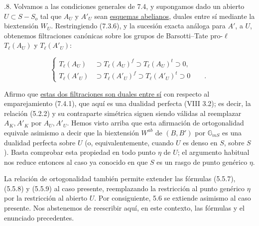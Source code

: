 \medskip
{}.8. Volvamos a las condiciones generales de 7.4, y supongamos dado
un abierto $U\subset S-S_o$ tal que $A_U$ y $A'_U$ sean
\underline{esquemas abelianos}, duales entre sí mediante la biextensión
$W_U$. Restringiendo (7.3.6), y la sucesión exacta análoga para $A'$, a
$U$, obtenemos filtraciones canónicas sobre los grupos de Barsotti--Tate
pro-$\ell$ $T_\ell(A_U)$ y $T_\ell(A'_U)$:

\begin{equation}\tag{7.4.9}
\left\{
\begin{aligned}
T_\ell(A_U)&\supset T_\ell(A_U)^f\supset T_\ell(A_U)^t\supset0,\\[4ex]
T_\ell(A'_U)&\supset T_\ell(A'_U)^f\supset T_\ell(A'_U)^t\supset0
\qquad .
\end{aligned}
\right.
\end{equation}


Afirmo que \underline{estas dos filtraciones son duales entre sí} con
respecto al emparejamiento (7.4.1), que aquí es una dualidad perfecta
(VIII 3.2); es decir, la relación (5.2.2) y su contraparte simétrica
siguen siendo válidas al reemplazar $A_K,A'_K$ por $A_U,A'_U$. Hemos
visto arriba que esta afirmación de ortogonalidad equivale asimismo a
decir que la biextensión $W^{ab}$ de $(B,B')$ por $\mathbb G_{mS}$ es
una dualidad perfecta sobre $U$ (o, equivalentemente, cuando $U$ es
denso en $S$, sobre $S$). Basta comprobar esta propiedad en todo punto
$\eta$ de $U$; el argumento habitual nos reduce entonces al caso ya
conocido en que $S$ es un rasgo de punto genérico $\eta$.

La relación de ortogonalidad también permite extender las fórmulas
(5.5.7), (5.5.8) y (5.5.9) al caso presente, reemplazando la restricción
al punto genérico $\eta$ por la restricción al abierto $U$. Por
consiguiente, 5.6 se extiende asimismo al caso presente. Nos abstenemos
de reescribir aquí, en este contexto, las fórmulas y el enunciado
precedentes.
